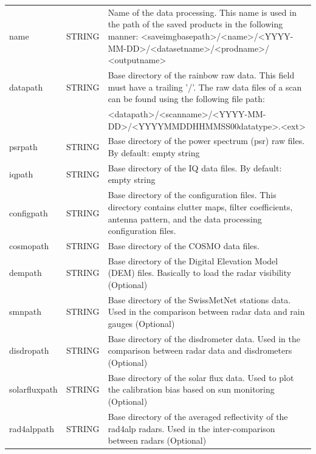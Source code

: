 \documentclass[a4paper,11pt,pdftex,twoside]{scrartcl}
\begin{document}
{{{\begin{longtable}{p{}p{}p{}}
name               & STRING    & Name of the data processing. This name is used
                                 in the path of the saved products in the following manner:
                                 <saveimgbasepath>/<name>/<YYYY-MM-DD>/<datasetname>/<prodname>/
                                 <outputname>\\
datapath           & STRING    & Base directory of the rainbow raw data. This field
                                 must have a trailing '/'. The raw data files of a scan
                                 can be found using the following file path:\\
                   &           & <datapath>/<scanname>/<YYYY-MM-DD>/<YYYYMMDDHHMMSS00datatype>.<ext>\\
psrpath            & STRING    & Base directory of the power spectrum (psr) raw files. By default:
                                 empty string\\
iqpath             & STRING    & Base directory of the IQ data files. By default: empty string\\
configpath         & STRING    & Base directory of the configuration files. This directory
                                 contains clutter maps, filter coefficients, antenna pattern,
                                 and the data processing configuration files.\\
cosmopath          & STRING    & Base directory of the COSMO data files.\\
dempath            & STRING    & Base directory of the Digital Elevation Model (DEM) files.
                                 Basically to load the radar visibility (Optional)\\
smnpath            & STRING    & Base directory of the SwissMetNet stations data. Used in the
                                 comparison between radar data and rain gauges (Optional)\\
disdropath         & STRING    & Base directory of the disdrometer data. Used in the comparison
                                 between radar data and disdrometers (Optional)\\
solarfluxpath      & STRING    & Base directory of the solar flux data. Used to plot the calibration
                                 bias based on sun monitoring (Optional)\\
rad4alppath        & STRING    & Base directory of the averaged reflectivity of the rad4alp radars.
                                 Used in the inter-comparison between radars (Optional)\\

\end{longtable}}}}
\end{document}
